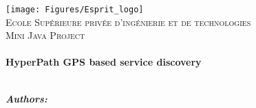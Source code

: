 
\begin{titlepage}
  \begin{center}
    \texttt{[image: Figures/Esprit\_logo]}
    \\[1cm]

    \textsc
    {
      \LARGE
      {
        Ecole Supérieure privée d'ingénierie et de technologies
      }
    }
    \\[1cm]

    \textsc
    {
      \Large
      {
        Mini Java Project
      }
    }
    \\[0.5cm]
    \HRule
    \\[0.5cm]

    {
      \huge\bfseries
      {
        HyperPath GPS based service discovery
      }
    }
    \\[0.5cm]
    \HRule
    \\[1.5cm]

    \begin{minipage}{0.4\textwidth}
      \begin{flushleft}
        \large
        \makebox
        {
          \textbf
          {
            \emph{Authors:}
          }
        }
        \\
        {
          \addtolength{\leftskip}{3mm}
          \\
          \\
        }
      \end{flushleft}
    \end{minipage}
    \begin{minipage}{0.4\textwidth}
      \begin{flushright} \large
        \begin{flushleft}
              \\
          {
            \addtolength{\leftskip}{3mm}
                                     \\
            \\
          }
        \end{flushleft}
      \end{flushright}
    \end{minipage}


\end{center}
\end{titlepage}
